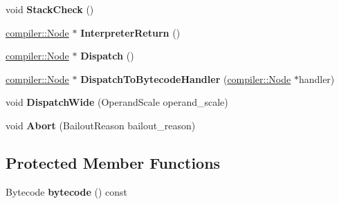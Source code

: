 \begin{DoxyCompactItemize}
\item 
void {\bfseries Stack\+Check} ()\hypertarget{classv8_1_1internal_1_1interpreter_1_1_interpreter_assembler_ae491d271a5d45aeed62b622a4ceadb32}{}\label{classv8_1_1internal_1_1interpreter_1_1_interpreter_assembler_ae491d271a5d45aeed62b622a4ceadb32}

\item 
\hyperlink{classv8_1_1internal_1_1compiler_1_1_node}{compiler\+::\+Node} $\ast$ {\bfseries Interpreter\+Return} ()\hypertarget{classv8_1_1internal_1_1interpreter_1_1_interpreter_assembler_afd7c06a858257e1b1b061c30a5a96252}{}\label{classv8_1_1internal_1_1interpreter_1_1_interpreter_assembler_afd7c06a858257e1b1b061c30a5a96252}

\item 
\hyperlink{classv8_1_1internal_1_1compiler_1_1_node}{compiler\+::\+Node} $\ast$ {\bfseries Dispatch} ()\hypertarget{classv8_1_1internal_1_1interpreter_1_1_interpreter_assembler_a0cefb945d4bf73fd69a3a6f1fcf48d87}{}\label{classv8_1_1internal_1_1interpreter_1_1_interpreter_assembler_a0cefb945d4bf73fd69a3a6f1fcf48d87}

\item 
\hyperlink{classv8_1_1internal_1_1compiler_1_1_node}{compiler\+::\+Node} $\ast$ {\bfseries Dispatch\+To\+Bytecode\+Handler} (\hyperlink{classv8_1_1internal_1_1compiler_1_1_node}{compiler\+::\+Node} $\ast$handler)\hypertarget{classv8_1_1internal_1_1interpreter_1_1_interpreter_assembler_a16d35e3be5f583fbc7c49b1392db392f}{}\label{classv8_1_1internal_1_1interpreter_1_1_interpreter_assembler_a16d35e3be5f583fbc7c49b1392db392f}

\item 
void {\bfseries Dispatch\+Wide} (Operand\+Scale operand\+\_\+scale)\hypertarget{classv8_1_1internal_1_1interpreter_1_1_interpreter_assembler_a95727da6307472c66e173f78f6c8e646}{}\label{classv8_1_1internal_1_1interpreter_1_1_interpreter_assembler_a95727da6307472c66e173f78f6c8e646}

\item 
void {\bfseries Abort} (Bailout\+Reason bailout\+\_\+reason)\hypertarget{classv8_1_1internal_1_1interpreter_1_1_interpreter_assembler_aca065f4c9fbed9abca1a18cdde4412cf}{}\label{classv8_1_1internal_1_1interpreter_1_1_interpreter_assembler_aca065f4c9fbed9abca1a18cdde4412cf}

\end{DoxyCompactItemize}
\subsection*{Protected Member Functions}
\begin{DoxyCompactItemize}
\item 
Bytecode {\bfseries bytecode} () const \hypertarget{classv8_1_1internal_1_1interpreter_1_1_interpreter_assembler_a579f271f22e2dac382fe0a4499ef8708}{}\label{classv8_1_1internal_1_1interpreter_1_1_interpreter_assembler_a579f271f22e2dac382fe0a4499ef8708}

\end{DoxyCompactItemize}
